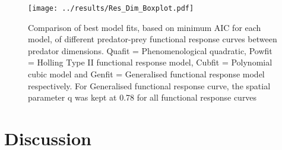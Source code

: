 \documentclass[11pt]{article}
\begin{document}
\begin{figure}[h!]
	\centering 
	\texttt{[image: ../results/Res\_Dim\_Boxplot.pdf]}
	\caption{Comparison of best model fits, based on minimum AIC for each model, of different predator-prey functional response curves between predator dimensions. Quafit = Phenomenological quadratic, Powfit = Holling Type II functional response model, Cubfit = Polynomial cubic model and Genfit = Generalised functional response model respectively. For Generalised functional response curve, the spatial parameter q was kept at 0.78 for all functional response curves}
	\label{Resource Dimensionality Boxplot of model types}
\end{figure}
\newpage


	\section*{Discussion}
\noindent
\end{document}
